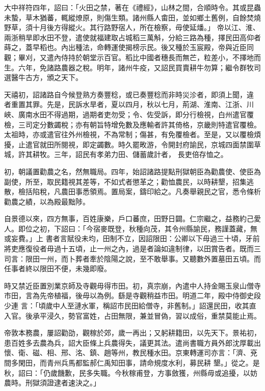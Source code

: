 \begin{pinyinscope}
 大中祥符四年，詔曰：「火田之禁，著在《禮經》，山林之間，合順時令。其或昆蟲未蟄，草木猶蕃，輒縱燎原，則傷生類。諸州縣人畬田，並如鄉土舊例，自餘焚燒野草，須十月後方得縱火。其行路野宿人，所在檢察，毋使延燔。」
 帝以江、淮、兩浙稍旱即水田不登，遣使就福建取占城稻三萬斛，分給三路為種，擇民田高仰者蒔之，蓋早稻也。內出種法，命轉運使揭榜示民。後又種於玉宸殿，帝與近臣同觀；畢刈，又遣內侍持於朝堂示百官。稻比中國者穗長而無芒，粒差小，不擇地而生。六年，免諸路農器之稅。明年，諸州牛疫，又詔民買賣耕牛勿算；繼令群牧司選醫牛古方，頒之天下。



 天禧初，詔諸路自今候登熟方奏豐稔，或已奏豐稔而非時災沴者，即須上聞，違
 者重置其罪。先是，民訴水旱者，夏以四月，秋以七月，荊湖、淮南、江浙、川峽、廣南水田不得過期，過期者吏勿受；令、佐受訴，即分行檢視，白州遣官覆檢，三司定分數蠲稅；亦有朝旨特增免數及應輸者許其倚格，京畿則特遣官覆檢。太祖時，亦或遣官往外州檢視，不為常制；傷甚，有免覆檢者。至是，又以覆檢煩擾，止遣官就田所閱視，即定蠲數。時久罷畋游，令開封府諭民，京城四面禁圍草城，許其耕牧。三年，詔民有孝弟力田、儲蓄歲計者，
 長吏倍存恤之。



 初，朝議置勸農之名，然無職局。四年，始詔諸路提點刑獄朝臣為勸農使、使臣為副使，所至，取民籍視其差等，不如式者懲革之；勸恤農民，以時耕墾，招集逃散，檢括陷稅，凡農田事悉領焉。置局案，鑄印給之。凡奏舉親民之官，悉令條析勸農之績，以為殿最黜陟。



 自景德以來，四方無事，百姓康樂，戶口蕃庶，田野日闢。仁宗繼之，益務約己愛人。即位之初，下詔曰：「今宿麥既登，秋種向茂，其令州縣諭民，務謹蓋藏，無或妄費。」上
 書者言賦役未均，田制不立，因詔限田：公卿以下毋過三十頃，牙前將吏應復役者毋過十五頃，止一州之內，過是者論如違制律，以田賞告者。既而三司言：限田一州，而卜葬者牽於陰陽之說，至不敢舉事。又聽數外置墓田五頃。而任事者終以限田不便，未幾即廢。



 時又禁近臣置別業京師及寺觀毋得市田。初，真宗崩，內遣中人持金賜玉泉山僧寺市田，言為先帝植福，後毋以為例。繇是寺觀稍益市田。明道二年，殿中侍御史段少連
 言：「頃歲中人至漣水軍，稱詔市民田給僧寺，非舊制。」詔還民田，收其直入官。後承平浸久，勢官富姓，占田無限，兼並冒偽，習以成俗，重禁莫能止焉。



 帝敦本務農，屢詔勸劭，觀稼於郊，歲一再出；又躬耕籍田，以先天下。景祐初，患百姓多去農為兵，詔大臣條上兵農得失，議更其法。遣尚書職方員外郎沈厚載出懷、衛、磁、相、邢、洺、鎮、趙等州，教民種水田。京東轉運司亦言：「濟、兗間多閑田，而青州兵馬都監郝仁禹知田事，請命規度水利，募民耕
 墾。」從之。是秋，詔曰：「仍歲饑歉，民多失職。今秋稼甫登，方事斂獲，州縣毋或追擾，以妨農時。刑獄須證逮者速決之。」




\end{pinyinscope}
